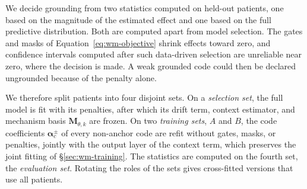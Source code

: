 We decide grounding from two statistics computed on held-out patients, one based on the magnitude of the estimated effect and one based on the full predictive distribution. Both are computed apart from model selection. The gates and masks of Equation~\eqref{eq:wm-objective} shrink effects toward zero, and confidence intervals computed after such data-driven selection are unreliable near zero, where the decision is made. A weak grounded code could then be declared ungrounded because of the penalty alone.

We therefore split patients into four disjoint sets. On a \emph{selection set}, the full model is fit with its penalties, after which its drift term, context estimator, and mechanism basis $\mathbf{M}_{\theta,k}$ are frozen. On two \emph{training sets}, $A$ and $B$, the code coefficients $\boldsymbol{\alpha}^{\pm}_c$ of every non-anchor code are refit without gates, masks, or penalties, jointly with the output layer of the context term, which preserves the joint fitting of \S\ref{sec:wm-training}. The statistics are computed on the fourth set, the \emph{evaluation set}. Rotating the roles of the sets gives cross-fitted versions that use all patients.

